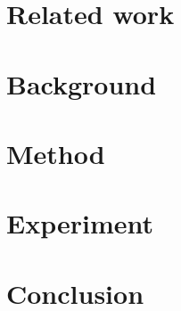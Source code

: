 \documentclass[conference]{IEEEtran}
\begin{document}
\section{Related work}

\section{Background}

\section{Method}

\section{Experiment}

\section{Conclusion}




\date{\today}



\newpage
%
\end{document}
